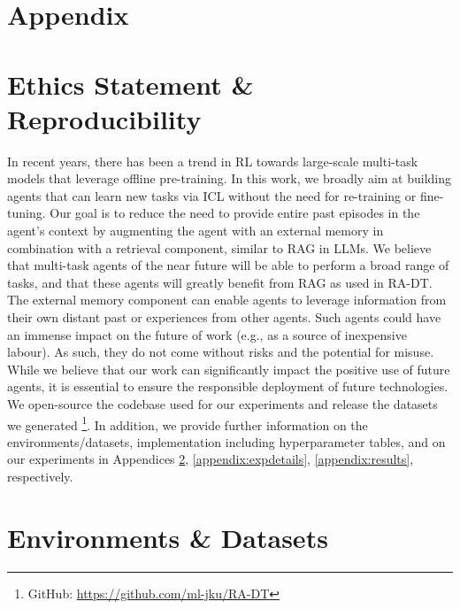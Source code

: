 \documentclass{article}
\begin{document}
\section*{Appendix}
\renewcommand{\baselinestretch}{0.75}\normalsize
\tableofcontents
\section{Ethics Statement \& Reproducibility}\label{appendix:impact}
In recent years, there has been a trend in RL towards large-scale multi-task models that leverage offline pre-training.
In this work, we broadly aim at building agents that can learn new tasks via ICL without the need for re-training or fine-tuning.
Our goal is to reduce the need to provide entire past episodes in the agent's context by augmenting the agent with an external memory in combination with a retrieval component, similar to RAG in LLMs.
We believe that multi-task agents of the near future will be able to perform a broad range of tasks, and that these agents will greatly benefit from RAG as used in RA-DT.
The external memory component can enable agents to leverage information from their own distant past or experiences from other agents.
Such agents could have an immense impact on the future of work (e.g., as a source of inexpensive labour).
As such, they do not come without risks and the potential for misuse.
While we believe that our work can significantly impact the positive use of future agents, it is essential to ensure the responsible deployment of future technologies.
We open-source the codebase used for our experiments and release the datasets we generated \footnote{GitHub: \url{https://github.com/ml-jku/RA-DT}}.
In addition, we provide further information on the environments/datasets, implementation including hyperparameter tables, and on our experiments in Appendices \ref{appendix:env-data}, \ref{appendix:expdetails}, \ref{appendix:results}, respectively.
\section{Environments \& Datasets}\label{appendix:env-data}
\end{document}
